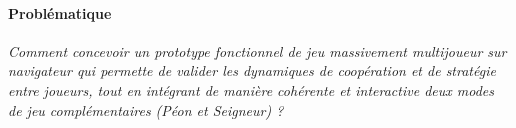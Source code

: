 \paragraph{Problématique}
\textit{Comment concevoir un prototype fonctionnel de jeu massivement multijoueur sur navigateur qui permette de valider les dynamiques de coopération et de stratégie entre joueurs, tout en intégrant de manière cohérente et interactive deux modes de jeu complémentaires (Péon et Seigneur) ?}
